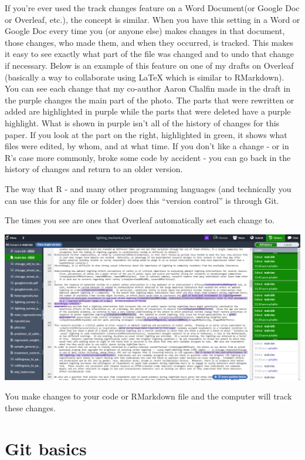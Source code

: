 \documentclass[
]{krantz}
\begin{document}
If you're ever used the track changes feature on a Word Document(or Google Doc or Overleaf, etc.), the concept is similar. When you have this setting in a Word or Google Doc every time you (or anyone else) makes changes in that document, those changes, who made them, and when they occurred, is tracked. This makes it easy to see exactly what part of the file was changed and to undo that change if necessary. Below is an example of this feature on one of my drafts on Overleaf (basically a way to collaborate using LaTeX which is similar to RMarkdown). You can see each change that my co-author Aaron Chalfin made in the draft in the purple changes the main part of the photo. The parts that were rewritten or added are highlighted in purple while the parts that were deleted have a purple highlight. What is shown in purple isn't all of the history of changes for this paper. If you look at the part on the right, highlighted in green, it shows what files were edited, by whom, and at what time. If you don't like a change - or in R's case more commonly, broke some code by accident - you can go back in the history of changes and return to an older version.

The way that R - and many other programming languages (and technically you can use this for any file or folder) does this ``version control'' is through Git.

The times you see are ones that Overleaf automatically set each change to.

\includegraphics{images/overleaf.png}

You make changes to your code or RMarkdown file and the computer will track these changes.

\hypertarget{git-basics}{%
\section{Git basics}\label{git-basics}}
\end{document}
